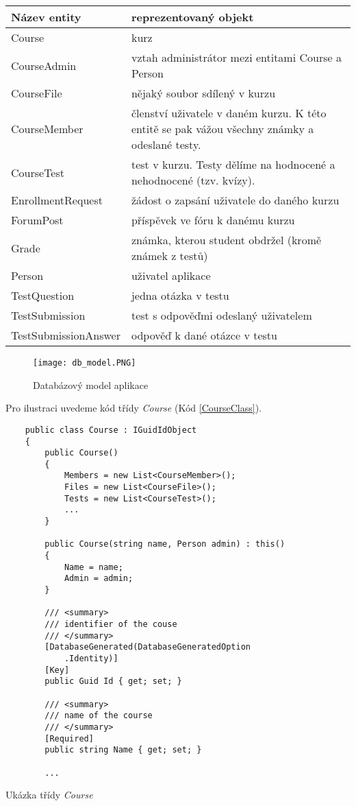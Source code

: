 \begin{table}[ht]
	\centering
	\begin{tabular}{| l | p{9cm} |}
		\hline
		Název entity & reprezentovaný objekt \\
		\hline \hline
		Course & kurz \\ \hline
		CourseAdmin & vztah administrátor mezi entitami Course a Person \\ \hline		
		CourseFile & nějaký soubor sdílený v kurzu \\ \hline
		CourseMember & členství uživatele v daném kurzu. 
		K této entitě se pak vážou všechny známky a odeslané testy. \\ \hline
		CourseTest & test v kurzu. Testy dělíme na hodnocené a nehodnocené (tzv. kvízy). \\ \hline
		EnrollmentRequest & žádost o zapsání uživatele do daného kurzu \\ \hline
		ForumPost & příspěvek ve fóru k danému kurzu \\ \hline
		Grade & známka, kterou student obdržel (kromě známek z testů) \\ \hline
		Person & uživatel aplikace \\ \hline
		TestQuestion & jedna otázka v testu \\ \hline
		TestSubmission & test s odpověďmi odeslaný uživatelem \\ \hline
		TestSubmissionAnswer & odpověď k dané otázce v testu \\
		\hline
	\end{tabular}
\end{table}

\newpage

\begin{figure}
	\centering
	\texttt{[image: db\_model.PNG]}
	\caption{Databázový model aplikace}
	\label{fig:DbModel}
\end{figure}

\newpage

Pro ilustraci uvedeme kód třídy \textit{Course} (Kód \ref{CourseClass}).

\begin{program}
	\begin{lstlisting}
	public class Course : IGuidIdObject
	{
		public Course()
		{
			Members = new List<CourseMember>();
			Files = new List<CourseFile>();
			Tests = new List<CourseTest>();
			...
		}
		
		public Course(string name, Person admin) : this()
		{
			Name = name;
			Admin = admin;
		}
		
		/// <summary>
		/// identifier of the couse
		/// </summary>
		[DatabaseGenerated(DatabaseGeneratedOption
			.Identity)]
		[Key]
		public Guid Id { get; set; }
		
		/// <summary>
		/// name of the course
		/// </summary>
		[Required]
		public string Name { get; set; }
		
		...
	\end{lstlisting}
	\caption{Ukázka třídy \textit{Course}}
	\label{CourseClass}
\end{program}

